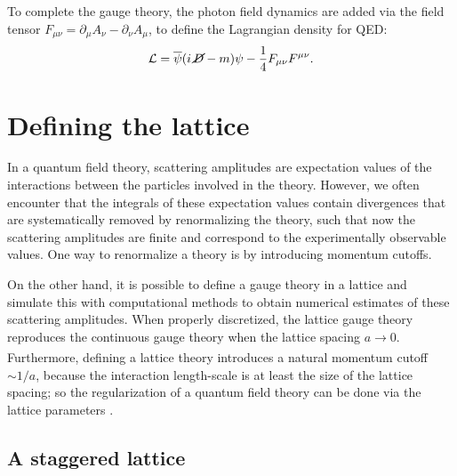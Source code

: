 \documentclass[a4paper]{report}
\begin{document}
\begin{spacing}{1.1}
To complete the gauge theory, the photon field dynamics are added via the field tensor $F_{\mu\nu} = \partial_\mu A_\nu - \partial_\nu A_\mu$, to define the Lagrangian density for QED:
\begin{equation} \label{eq:L_QED}
    \mathcal{L} = \overline{\psi}(i\,\cancel D-m)\psi-\frac{1}{4}F_{\mu\nu}F^{\mu\nu}.
\end{equation}



\section{Defining the lattice}

In a quantum field theory, scattering amplitudes are expectation values of the interactions between the particles involved in the theory. However, we often encounter that the integrals of these expectation values contain divergences that are systematically removed by renormalizing the theory, such that now the scattering amplitudes are finite and correspond to the experimentally observable values. One way to renormalize a theory is by introducing momentum cutoffs.

On the other hand, it is possible to define a gauge theory in a lattice and simulate this with computational methods to obtain numerical estimates of these scattering amplitudes. When properly discretized, the lattice gauge theory reproduces the continuous gauge theory when the lattice spacing $a\xrightarrow[]{}0$. Furthermore, defining a lattice theory introduces a natural momentum cutoff $\sim 1/a$, because the interaction length-scale is at least the size of the lattice spacing; so the regularization of a quantum field theory can be done via the lattice parameters \cite{wiese2013ultracold}.




\subsection{A staggered lattice}


\end{spacing}
\end{document}
